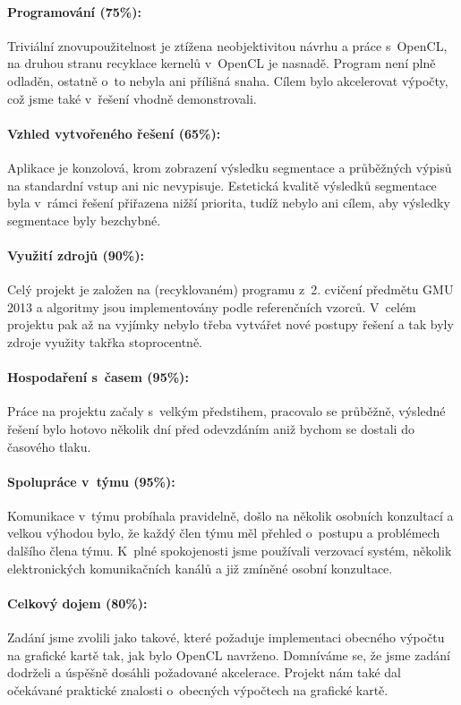 \documentclass[11pt,a4paper]{article}
\begin{document}
\paragraph{Programování (75\%):}
Triviální znovupoužitelnost je ztížena neobjektivitou návrhu a práce s~OpenCL, na druhou stranu recyklace kernelů v~OpenCL je nasnadě. Program není plně odladěn, ostatně o~to nebyla ani přílišná snaha. Cílem bylo akcelerovat výpočty, což jsme také v~řešení vhodně demonstrovali.

\paragraph{Vzhled vytvořeného řešení (65\%):}
Aplikace je konzolová, krom zobrazení výsledku segmentace a průběžných výpisů na standardní vstup ani nic nevypisuje. Estetická kvalitě výsledků segmentace byla v~rámci řešení přiřazena nižší priorita, tudíž nebylo ani cílem, aby výsledky segmentace byly bezchybné.

\paragraph{Využití zdrojů (90\%):}
Celý projekt je založen na (recyklovaném) programu z~2. cvičení předmětu GMU 2013 a algoritmy jsou implementovány podle referenčních vzorců. V~celém projektu pak až na vyjímky nebylo třeba vytvářet nové postupy řešení a tak byly zdroje využity takřka stoprocentně.

\paragraph{Hospodaření s~časem (95\%):}
Práce na projektu začaly s~velkým předstihem, pracovalo se průběžně, výsledné řešení bylo hotovo několik dní před odevzdáním aniž bychom se dostali do časového tlaku.

\paragraph{Spolupráce v~týmu (95\%):}
Komunikace v~týmu probíhala pravidelně, došlo na několik osobních konzultací a velkou výhodou bylo, že každý člen týmu měl přehled o~postupu a problémech dalšího člena týmu. K~plné spokojenosti jsme používali verzovací systém, několik elektronických komunikačních kanálů a již zmíněné osobní konzultace.

\paragraph{Celkový dojem (80\%):}
Zadání jsme zvolili jako takové, které požaduje implementaci obecného výpočtu na grafické kartě tak, jak bylo OpenCL navrženo. Domníváme se, že jsme zadání dodrželi a úspěšně dosáhli požadované akcelerace. Projekt nám také dal očekávané praktické znalosti o~obecných výpočtech na grafické kartě.
\end{document}
